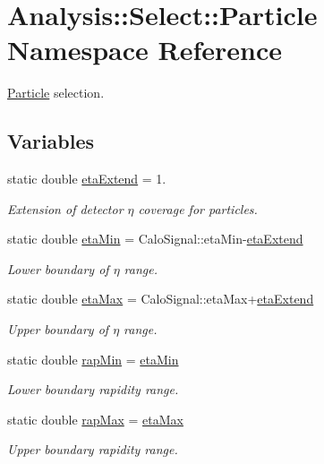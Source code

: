 \hypertarget{namespaceAnalysis_1_1Select_1_1Particle}{}\section{Analysis\+:\+:Select\+:\+:Particle Namespace Reference}
\label{namespaceAnalysis_1_1Select_1_1Particle}


\hyperlink{namespaceAnalysis_1_1Select_1_1Particle}{Particle} selection.  


\subsection*{Variables}
\begin{DoxyCompactItemize}
\item 
static double \hyperlink{namespaceAnalysis_1_1Select_1_1Particle_ab5299c0a57bfa014570ccdeded3bcaf5}{eta\+Extend} = 1.
\begin{DoxyCompactList}\small\item\em Extension of detector $ \eta $ coverage for particles. \end{DoxyCompactList}\item 
static double \hyperlink{namespaceAnalysis_1_1Select_1_1Particle_ac17ab5165e634e471d1d520d814a8e69}{eta\+Min} = Calo\+Signal\+::eta\+Min-\/\hyperlink{namespaceAnalysis_1_1Select_1_1Particle_ab5299c0a57bfa014570ccdeded3bcaf5}{eta\+Extend}
\begin{DoxyCompactList}\small\item\em Lower boundary of $ \eta $ range. \end{DoxyCompactList}\item 
static double \hyperlink{namespaceAnalysis_1_1Select_1_1Particle_a216c67e30d7e332f2da3e29fe69a9c06}{eta\+Max} = Calo\+Signal\+::eta\+Max+\hyperlink{namespaceAnalysis_1_1Select_1_1Particle_ab5299c0a57bfa014570ccdeded3bcaf5}{eta\+Extend}
\begin{DoxyCompactList}\small\item\em Upper boundary of $ \eta $ range. \end{DoxyCompactList}\item 
static double \hyperlink{namespaceAnalysis_1_1Select_1_1Particle_a74ff6d11b36b671ebc16e69953b5fa26}{rap\+Min} = \hyperlink{namespaceAnalysis_1_1Select_1_1Particle_ac17ab5165e634e471d1d520d814a8e69}{eta\+Min}
\begin{DoxyCompactList}\small\item\em Lower boundary rapidity range. \end{DoxyCompactList}\item 
static double \hyperlink{namespaceAnalysis_1_1Select_1_1Particle_ae064bc4211aab509277062751d7b5bf2}{rap\+Max} = \hyperlink{namespaceAnalysis_1_1Select_1_1Particle_a216c67e30d7e332f2da3e29fe69a9c06}{eta\+Max}
\begin{DoxyCompactList}\small\item\em Upper boundary rapidity range. \end{DoxyCompactList}\end{DoxyCompactItemize}


